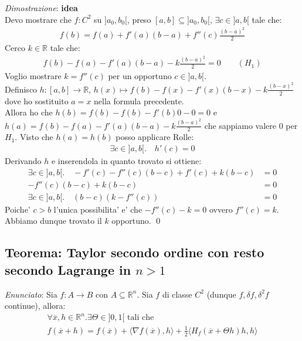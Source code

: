 \documentclass{article}
\begin{document}
\noindent \emph{Dimostrazione}: \textbf{idea} \\
Devo mostrare che $f: C^2$ su $]a_0, b_0[$, preso $[a,b] \subseteq ]a_0,b_0[$,
$\exists c \in ]a,b[$ tale che:
\begin{align*}
  f(b) = f(a) + f'(a)(b-a) + f''(c)\frac{(b-a)^2}{2}
\end{align*}
Cerco $k \in \mathbb{R}$ tale che:
\begin{align*}
  f(b) - f(a) - f'(a)(b-a) - k\frac{(b-a)^2}{2} = 0 \qquad (H_1)
\end{align*}
Voglio mostrare $k = f''(c)$ per un opportuno $c \in ]a, b[$. \\
Definisco $h: [a,b] \to \mathbb{R}$, $h(x) \mapsto f(b) - f(x) - f'(x)(b-x) - k\frac{(b-x)^2}{2}$ dove
ho sostituito $a = x$ nella formula precedente. \\
Allora ho che $h(b) = f(b) - f(b) - f'(b)0 - 0 = 0$ e $h(a) = f(b) - f(a) - f'(a)(b-a) - k\frac{(b-a)^2}{2}$
che sappiamo valere $0$ per $H_1$. Visto che $h(a) = h(b)$ posso applicare Rolle:
\begin{align*}
  \exists c \in ]a,b[. \quad h'(c) = 0
\end{align*}
Derivando $h$ e inserendola in quanto trovato si ottiene:
\begin{align*}
  \exists c \in ]a,b[. \quad -f'(c) - f''(c)(b-c) + f'(c) + k(b-c) &= 0\\
  - f''(c)(b-c) + k(b-c) &= 0 \\
  \exists c \in ]a,b[. \quad (b-c)(k - f''(c)) &= 0
\end{align*}
Poiche' $c > b$ l'unica possibilita' e' che $-f''(c) - k = 0$ ovvero $f''(c) = k$.
Abbiamo dunque trovato il $k$ opportuno. \qed

\subsection{Teorema: Taylor secondo ordine con resto secondo Lagrange in $n>1$}

\emph{Enunciato}: Sia $f: A \to B$ con $A \subseteq \mathbb{R}^n$. Sia $f$ di
classe $C^2$ (dunque $f, \delta f, \delta^2 f$ continue), allora:
\begin{align*}
  \forall \overline{x}, h \in \mathbb{R}^n. \exists \Theta \in ]0, 1[ \text{ tali che } \\
  f(\overline{x} + h) = f(\overline{x}) + \langle \nabla f(\overline{x}), h
  \rangle + \frac{1}{2} \langle H_f(\overline{x} + \Theta h)h, h \rangle
\end{align*}
\end{document}
